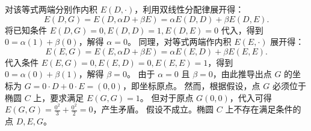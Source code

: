 \begin{solution}
对该等式两端分别作内积 $E(D, \cdot)$，利用双线性分配律展开得：
\[
E(D, G) = E(D, \alpha D + \beta E) = \alpha E(D, D) + \beta E(D, E).
\]
将已知条件 $E(D, G) = 0, E(D, D) = 1, E(D, E) = 0$ 代入，得到 $0 = \alpha(1) + \beta(0)$，解得 $\alpha = 0$。
同理，对等式两端作内积 $E(E, \cdot)$ 展开得：
\[
E(E, G) = E(E, \alpha D + \beta E) = \alpha E(E, D) + \beta E(E, E).
\]
代入条件 $E(E, G) = 0, E(E, D) = 0, E(E, E) = 1$，得到 $0 = \alpha(0) + \beta(1)$，解得 $\beta = 0$。
由于 $\alpha = 0$ 且 $\beta = 0$，由此推导出点 $G$ 的坐标为 $G = 0 \cdot D + 0 \cdot E = (0, 0)$，即坐标原点。
然而，根据假设，点 $G$ 必须位于椭圆 $C$ 上，要求满足 $E(G, G) = 1$。
但对于原点 $G(0, 0)$，代入可得 $E(G, G) = \frac{0^2}{3} + \frac{0^2}{2} = 0$，产生矛盾。
假设不成立。椭圆 $C$ 上不存在满足条件的点 $D, E, G$。
\end{solution}



